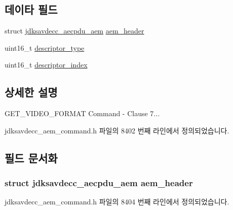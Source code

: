 \subsection*{데이타 필드}
\begin{DoxyCompactItemize}
\item 
struct \hyperlink{structjdksavdecc__aecpdu__aem}{jdksavdecc\+\_\+aecpdu\+\_\+aem} \hyperlink{structjdksavdecc__aem__command__get__video__format_ae1e77ccb75ff5021ad923221eab38294}{aem\+\_\+header}
\item 
uint16\+\_\+t \hyperlink{structjdksavdecc__aem__command__get__video__format_ab7c32b6c7131c13d4ea3b7ee2f09b78d}{descriptor\+\_\+type}
\item 
uint16\+\_\+t \hyperlink{structjdksavdecc__aem__command__get__video__format_a042bbc76d835b82d27c1932431ee38d4}{descriptor\+\_\+index}
\end{DoxyCompactItemize}


\subsection{상세한 설명}
G\+E\+T\+\_\+\+V\+I\+D\+E\+O\+\_\+\+F\+O\+R\+M\+AT Command -\/ Clause 7... 

jdksavdecc\+\_\+aem\+\_\+command.\+h 파일의 8402 번째 라인에서 정의되었습니다.



\subsection{필드 문서화}
\subsubsection[{\texorpdfstring{aem\+\_\+header}{aem_header}}]{\setlength{\rightskip}{0pt plus 5cm}struct {\bf jdksavdecc\+\_\+aecpdu\+\_\+aem} aem\+\_\+header}\hypertarget{structjdksavdecc__aem__command__get__video__format_ae1e77ccb75ff5021ad923221eab38294}{}\label{structjdksavdecc__aem__command__get__video__format_ae1e77ccb75ff5021ad923221eab38294}


jdksavdecc\+\_\+aem\+\_\+command.\+h 파일의 8404 번째 라인에서 정의되었습니다.

